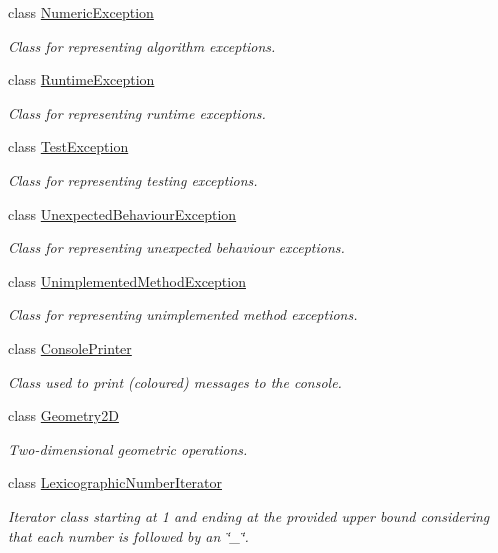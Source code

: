 \begin{DoxyCompactItemize}
class \hyperlink{classmultiscale_1_1NumericException}{\-Numeric\-Exception}
\begin{DoxyCompactList}\small\item\em \-Class for representing algorithm exceptions. \end{DoxyCompactList}\item 
class \hyperlink{classmultiscale_1_1RuntimeException}{\-Runtime\-Exception}
\begin{DoxyCompactList}\small\item\em \-Class for representing runtime exceptions. \end{DoxyCompactList}\item 
class \hyperlink{classmultiscale_1_1TestException}{\-Test\-Exception}
\begin{DoxyCompactList}\small\item\em \-Class for representing testing exceptions. \end{DoxyCompactList}\item 
class \hyperlink{classmultiscale_1_1UnexpectedBehaviourException}{\-Unexpected\-Behaviour\-Exception}
\begin{DoxyCompactList}\small\item\em \-Class for representing unexpected behaviour exceptions. \end{DoxyCompactList}\item 
class \hyperlink{classmultiscale_1_1UnimplementedMethodException}{\-Unimplemented\-Method\-Exception}
\begin{DoxyCompactList}\small\item\em \-Class for representing unimplemented method exceptions. \end{DoxyCompactList}\item 
class \hyperlink{classmultiscale_1_1ConsolePrinter}{\-Console\-Printer}
\begin{DoxyCompactList}\small\item\em \-Class used to print (coloured) messages to the console. \end{DoxyCompactList}\item 
class \hyperlink{classmultiscale_1_1Geometry2D}{\-Geometry2\-D}
\begin{DoxyCompactList}\small\item\em \-Two-\/dimensional geometric operations. \end{DoxyCompactList}\item 
class \hyperlink{classmultiscale_1_1LexicographicNumberIterator}{\-Lexicographic\-Number\-Iterator}
\begin{DoxyCompactList}\small\item\em \-Iterator class starting at 1 and ending at the provided upper bound considering that each number is followed by an \char`\"{}\-\_\-\char`\"{}. \end{DoxyCompactList}\item 

\end{DoxyCompactItemize}
